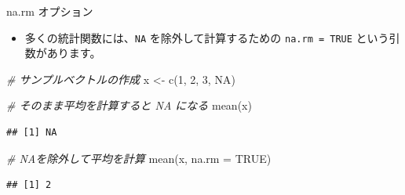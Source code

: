 \documentclass[
  ignorenonframetext,
]{beamer}
\newenvironment{Shaded}{\begin{snugshade}}{\end{snugshade}}
\newcommand{\AttributeTok}[1]{\textcolor[rgb]{0.77,0.63,0.00}{#1}}
\newcommand{\CommentTok}[1]{\textcolor[rgb]{0.56,0.35,0.01}{\textit{#1}}}
\newcommand{\ConstantTok}[1]{\textcolor[rgb]{0.00,0.00,0.00}{#1}}
\newcommand{\DecValTok}[1]{\textcolor[rgb]{0.00,0.00,0.81}{#1}}
\newcommand{\FunctionTok}[1]{\textcolor[rgb]{0.00,0.00,0.00}{#1}}
\newcommand{\NormalTok}[1]{#1}
\newcommand{\OtherTok}[1]{\textcolor[rgb]{0.56,0.35,0.01}{#1}}
\providecommand{\tightlist}{%
  \setlength{\itemsep}{0pt}\setlength{\parskip}{0pt}}
\begin{document}
\begin{frame}[fragile]{na.rm オプション}
\protect\hypertarget{na.rm-ux30aaux30d7ux30b7ux30e7ux30f3}{}
\begin{itemize}
\tightlist
\item
  多くの統計関数には、\texttt{NA} を除外して計算するための
  \texttt{na.rm\ =\ TRUE} という引数があります。
\end{itemize}

\scriptsize

\begin{Shaded}
\begin{Highlighting}[]
\CommentTok{\# サンプルベクトルの作成}
\NormalTok{x }\OtherTok{\textless{}{-}} \FunctionTok{c}\NormalTok{(}\DecValTok{1}\NormalTok{, }\DecValTok{2}\NormalTok{, }\DecValTok{3}\NormalTok{, }\ConstantTok{NA}\NormalTok{)}

\CommentTok{\# そのまま平均を計算すると NA になる}
\FunctionTok{mean}\NormalTok{(x)}
\end{Highlighting}
\end{Shaded}

\begin{verbatim}
## [1] NA
\end{verbatim}

\begin{Shaded}
\begin{Highlighting}[]
\CommentTok{\# NAを除外して平均を計算}
\FunctionTok{mean}\NormalTok{(x, }\AttributeTok{na.rm =} \ConstantTok{TRUE}\NormalTok{)}
\end{Highlighting}
\end{Shaded}

\begin{verbatim}
## [1] 2
\end{verbatim}

\normalsize
\end{frame}
\end{document}
